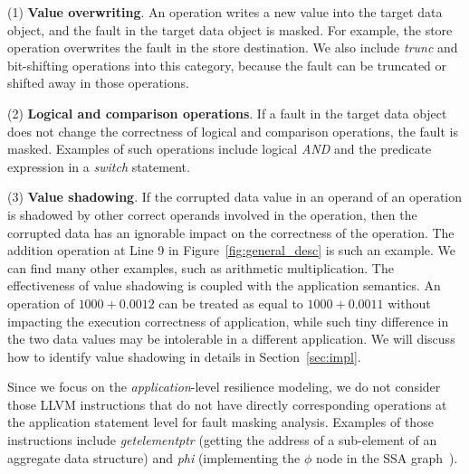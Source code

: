 (1) \textbf{Value overwriting}.  
An operation writes a new value into the target data object, 
and the fault in the target data object is masked. 
For example, the store operation overwrites the fault in the store destination. 
We also include \textit{trunc} and bit-shifting operations into this category, because the fault can be truncated or shifted away in those operations.

(2) \textbf{Logical and comparison operations}.
If a fault in the target data object does not
change the correctness of logical and comparison operations, the fault is masked.  
Examples of such operations 
include logical \textit{AND} and the predicate expression in a \textit{switch} statement.

(3) \textbf{Value shadowing}.
If the corrupted data value in an operand of an operation 
is shadowed by other correct operands involved in the operation,
then the corrupted data has an 
ignorable impact on the correctness of the operation.
The addition operation at Line 9 in Figure~\ref{fig:general_desc} is such an example. 
We can find many other examples, such as arithmetic multiplication. %
The effectiveness of value shadowing is coupled with the application semantics.  
An operation of $1000+0.0012$ can be treated as equal to $1000+0.0011$ without impacting the execution correctness of application,
while such tiny difference in the two data values may be intolerable in a different application. We will discuss how to identify value shadowing in details in Section~\ref{sec:impl}.

Since we focus on the \textit{application}-level resilience modeling,
we do not consider those LLVM instructions that do not have
directly corresponding operations at the application statement level for fault masking analysis. 
Examples of those instructions 
include \textit{getelementptr} (getting the address of a sub-element of an aggregate data structure)
and \textit{phi} (implementing the $\phi$ node in the SSA graph~\cite{llvm_lrm}).

